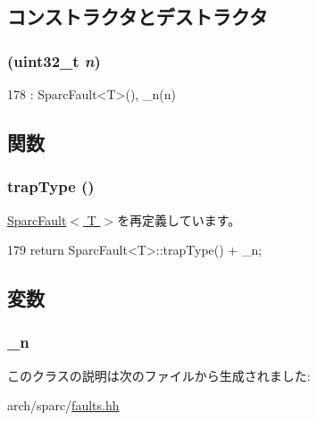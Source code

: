 \subsection{コンストラクタとデストラクタ}
\hypertarget{classSparcISA_1_1EnumeratedFault_ae5fa39ce2664a5f64c5923c83bf40b5a}{
\subsubsection[{EnumeratedFault}]{ ({\bf uint32\_\-t} {\em n})}}
\label{classSparcISA_1_1EnumeratedFault_ae5fa39ce2664a5f64c5923c83bf40b5a}



\begin{DoxyCode}
178 : SparcFault<T>(), _n(n) {}
\end{DoxyCode}


\subsection{関数}
\hypertarget{classSparcISA_1_1EnumeratedFault_aa059963bc65ed73d2d744374cd6da5b1}{
\subsubsection[{trapType}]{ trapType ()}}
\label{classSparcISA_1_1EnumeratedFault_aa059963bc65ed73d2d744374cd6da5b1}


\hyperlink{classSparcISA_1_1SparcFault_aa059963bc65ed73d2d744374cd6da5b1}{SparcFault$<$ T $>$}を再定義しています。


\begin{DoxyCode}
179 { return SparcFault<T>::trapType() + _n; }
\end{DoxyCode}


\subsection{変数}
\hypertarget{classSparcISA_1_1EnumeratedFault_a7c88a7c207b78997dab513d682ef9d76}{
\subsubsection[{\_\-n}]{ {\bf \_\-n}}}
\label{classSparcISA_1_1EnumeratedFault_a7c88a7c207b78997dab513d682ef9d76}


このクラスの説明は次のファイルから生成されました:\begin{DoxyCompactItemize}
\item 
arch/sparc/\hyperlink{arch_2sparc_2faults_8hh}{faults.hh}\end{DoxyCompactItemize}
